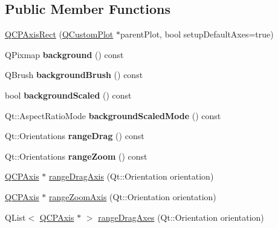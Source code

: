 \subsection*{Public Member Functions}
\begin{DoxyCompactItemize}
\item 
\mbox{\hyperlink{class_q_c_p_axis_rect_a60b31dece805462c1b82eea2e69ba042}{Q\+C\+P\+Axis\+Rect}} (\mbox{\hyperlink{class_q_custom_plot}{Q\+Custom\+Plot}} $\ast$parent\+Plot, bool setup\+Default\+Axes=true)
\item 
\mbox{\label{class_q_c_p_axis_rect_a572deec9c9a4d5987d5c5f78521991e6}} 
Q\+Pixmap {\bfseries background} () const
\item 
\mbox{\label{class_q_c_p_axis_rect_a7d09540e3fef12362d00e6bac92b6453}} 
Q\+Brush {\bfseries background\+Brush} () const
\item 
\mbox{\label{class_q_c_p_axis_rect_a059ede9a5fdcafb5cef280cd65fe4f3a}} 
bool {\bfseries background\+Scaled} () const
\item 
\mbox{\label{class_q_c_p_axis_rect_a06b98faf54b5491bff780294e423d3ff}} 
Qt\+::\+Aspect\+Ratio\+Mode {\bfseries background\+Scaled\+Mode} () const
\item 
\mbox{\label{class_q_c_p_axis_rect_aa3a84c768ad6edd08fd4c5dec176828f}} 
Qt\+::\+Orientations {\bfseries range\+Drag} () const
\item 
\mbox{\label{class_q_c_p_axis_rect_aa0d8414ef040523f8b2d55f0c0bddbee}} 
Qt\+::\+Orientations {\bfseries range\+Zoom} () const
\item 
\mbox{\hyperlink{class_q_c_p_axis}{Q\+C\+P\+Axis}} $\ast$ \mbox{\hyperlink{class_q_c_p_axis_rect_a6d7c22cfc54fac7a3d6ef80b133a8574}{range\+Drag\+Axis}} (Qt\+::\+Orientation orientation)
\item 
\mbox{\hyperlink{class_q_c_p_axis}{Q\+C\+P\+Axis}} $\ast$ \mbox{\hyperlink{class_q_c_p_axis_rect_a679c63f2b8daccfe6ec5110dce3dd3b6}{range\+Zoom\+Axis}} (Qt\+::\+Orientation orientation)
\item 
Q\+List$<$ \mbox{\hyperlink{class_q_c_p_axis}{Q\+C\+P\+Axis}} $\ast$ $>$ \mbox{\hyperlink{class_q_c_p_axis_rect_aae5f99a044ca911685a306f01b7ff941}{range\+Drag\+Axes}} (Qt\+::\+Orientation orientation)

\end{DoxyCompactItemize}
